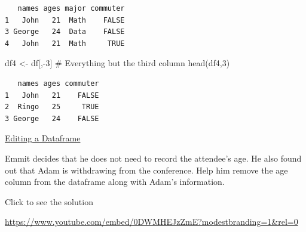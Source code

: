 \documentclass[
  letterpaper,
  DIV=11,
  numbers=noendperiod]{scrreprt}
\newenvironment{Shaded}{\begin{snugshade}}{\end{snugshade}}
\newcommand{\CommentTok}[1]{\textcolor[rgb]{0.37,0.37,0.37}{#1}}
\newcommand{\DecValTok}[1]{\textcolor[rgb]{0.68,0.00,0.00}{#1}}
\newcommand{\FunctionTok}[1]{\textcolor[rgb]{0.28,0.35,0.67}{#1}}
\newcommand{\NormalTok}[1]{\textcolor[rgb]{0.00,0.23,0.31}{#1}}
\newcommand{\OtherTok}[1]{\textcolor[rgb]{0.00,0.23,0.31}{#1}}
\newcommand{\SpecialCharTok}[1]{\textcolor[rgb]{0.37,0.37,0.37}{#1}}
\begin{document}
\begin{verbatim}
   names ages major commuter
1   John   21  Math    FALSE
3 George   24  Data    FALSE
4   John   21  Math     TRUE
\end{verbatim}

\begin{Shaded}
\begin{Highlighting}[]
\NormalTok{df4 }\OtherTok{\textless{}{-}}\NormalTok{ df[,}\SpecialCharTok{{-}}\DecValTok{3}\NormalTok{] }\CommentTok{\# Everything but the third column}
\FunctionTok{head}\NormalTok{(df4,}\DecValTok{3}\NormalTok{)}
\end{Highlighting}
\end{Shaded}

\begin{verbatim}
   names ages commuter
1   John   21    FALSE
2  Ringo   25     TRUE
3 George   24    FALSE
\end{verbatim}

\begin{watch}{}{}
    \href{https://youtu.be/us5M1ekgwUE}{Editing a Dataframe}
\end{watch}

\begin{tcolorbox}[enhanced jigsaw, leftrule=.75mm, arc=.35mm, coltitle=black, rightrule=.15mm, bottomrule=.15mm, toprule=.15mm, left=2mm, colbacktitle=quarto-callout-tip-color!10!white, title=\textcolor{quarto-callout-tip-color}{\faLightbulb}\hspace{0.5em}{Try it Out}, toptitle=1mm, breakable, colframe=quarto-callout-tip-color-frame, bottomtitle=1mm, titlerule=0mm, colback=white, opacityback=0, opacitybacktitle=0.6]

Emmit decides that he does not need to record the attendee's age. He
also found out that Adam is withdrawing from the conference. Help him
remove the age column from the dataframe along with Adam's information.

Click to see the solution

\url{https://www.youtube.com/embed/0DWMHEJzZmE?modestbranding=1&rel=0}

\end{tcolorbox}
\end{document}
